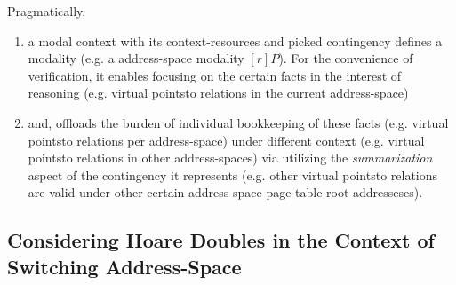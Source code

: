 \begin{remark}
Pragmatically, 
  \begin{enumerate}
  \item a modal context with its context-resources and picked contingency defines a modality (e.g. a address-space modality $[r]P$). For the convenience of verification, it enables focusing on the certain facts in the interest of reasoning (e.g. virtual pointsto relations in the current address-space)
  \item and, offloads the burden of individual bookkeeping of these facts (e.g. virtual pointsto relations per address-space) under different context (e.g. virtual pointsto relations in other address-spaces) via utilizing the \textit{summarization} aspect of the contingency it represents (e.g. other virtual pointsto relations are valid under other certain address-space page-table root addresseses).  
  \end{enumerate}
\end{remark}

\subsection{Considering Hoare Doubles in the Context of Switching Address-Space}
